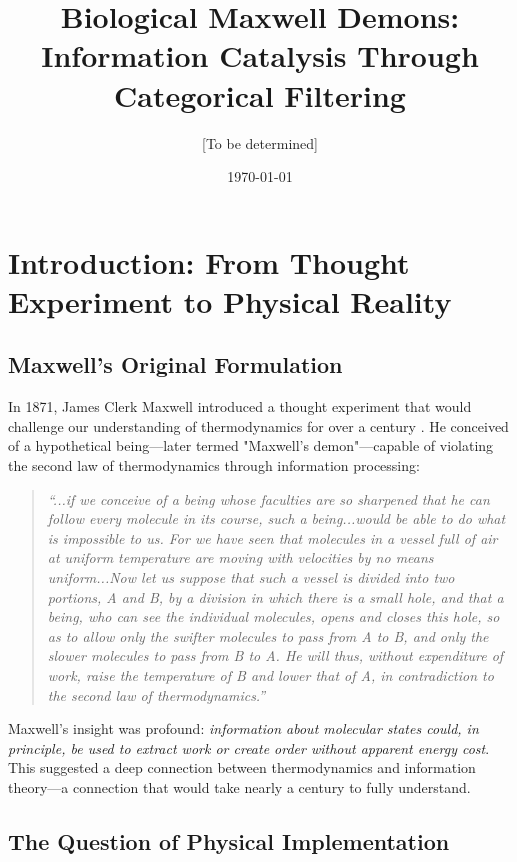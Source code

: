 \documentclass[11pt]{article}
\title{Biological Maxwell Demons: Information Catalysis Through Categorical Filtering}
\author{[To be determined]}
\date{\today}
\theoremstyle{remark}
\begin{document}
\maketitle

\section{Introduction: From Thought Experiment to Physical Reality}

\subsection{Maxwell's Original Formulation}

In 1871, James Clerk Maxwell introduced a thought experiment that would challenge our understanding of thermodynamics for over a century \cite{maxwell1871theory}. He conceived of a hypothetical being—later termed "Maxwell's demon"—capable of violating the second law of thermodynamics through information processing:

\begin{quote}
\textit{``...if we conceive of a being whose faculties are so sharpened that he can follow every molecule in its course, such a being...would be able to do what is impossible to us. For we have seen that molecules in a vessel full of air at uniform temperature are moving with velocities by no means uniform...Now let us suppose that such a vessel is divided into two portions, A and B, by a division in which there is a small hole, and that a being, who can see the individual molecules, opens and closes this hole, so as to allow only the swifter molecules to pass from A to B, and only the slower molecules to pass from B to A. He will thus, without expenditure of work, raise the temperature of B and lower that of A, in contradiction to the second law of thermodynamics.''}
\end{quote}

Maxwell's insight was profound: \textit{information about molecular states could, in principle, be used to extract work or create order without apparent energy cost}. This suggested a deep connection between thermodynamics and information theory—a connection that would take nearly a century to fully understand.

\subsection{The Question of Physical Implementation}
\end{document}

